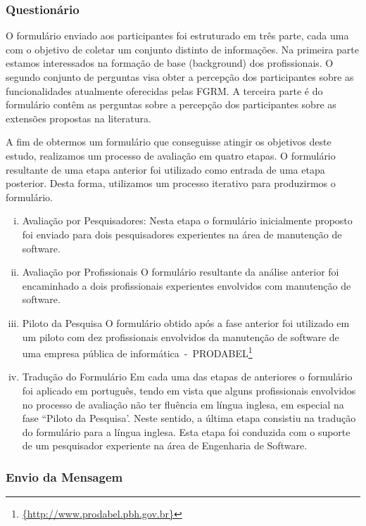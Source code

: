 \subsubsection{Questionário}
\label{subsec:questionario}

O formulário enviado aos participantes foi estruturado em três parte, cada uma
com o objetivo de coletar um conjunto distinto de informações. Na primeira parte
estamos interessados na formação de base (background) dos profissionais. O
segundo conjunto de perguntas visa obter a percepção dos participantes sobre as
funcionalidades atualmente oferecidas pelas FGRM\@. A terceira parte é do
formulário contêm as perguntas sobre a percepção dos participantes sobre as
extensões propostas na literatura.

A fim de obtermos um formulário que conseguisse atingir os objetivos deste
estudo, realizamos um processo de avaliação em quatro etapas. O formulário
resultante de uma etapa anterior foi utilizado como entrada de uma etapa
posterior. Desta forma, utilizamos um processo iterativo para produzirmos o
formulário.
\begin{enumerate}[(i)]
	\item Avaliação por Pesquisadores: Nesta etapa o formulário inicialmente
		proposto foi enviado para dois pesquisadores experientes na área de
		manutenção de software.
	\item Avaliação por Profissionais O formulário resultante da análise
		anterior foi encaminhado a dois profissionais experientes envolvidos com
		manutenção de software.
	\item Piloto da Pesquisa O formulário obtido após a fase anterior foi
		utilizado em um piloto com
		dez profissionais envolvidos da manutenção de software de uma empresa
		pública de
		informática~-~PRODABEL\footnote{\url{{http://www.prodabel.pbh.gov.br}}}
	\item Tradução do Formulário Em cada uma das etapas de anteriores o
		formulário foi aplicado em
		português, tendo em vista que alguns profissionais envolvidos no
		processo de avaliação não
		ter fluência em língua inglesa, em especial na fase ``Piloto da
		Pesquisa'. Neste sentido, a última etapa  consistiu na tradução do
		formulário para a língua inglesa.  Esta etapa foi conduzida com  o
		suporte de um pesquisador experiente na área de Engenharia de Software.	
\end{enumerate}

\subsubsection{Envio da Mensagem}

